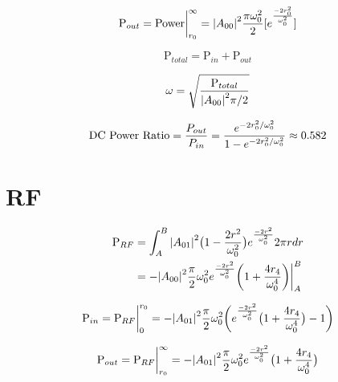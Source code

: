 \documentclass[oneside]{book}
\begin{document}
\begin{appendices}
	\begin{equation}
	\text{P}_{out} = \text{Power} \biggr\rvert_{r_0}^{\infty} = \abs{A_{00}}^2 \frac{\pi \omega_{0}^2}{2} [e^{\frac{-2r_0^2}{\omega_{0}^2}}]
	\end{equation}
	
	\begin{equation}
	\text{P}_{total} =  \text{P}_{in} + \text{P}_{out}
	\end{equation}
	
	\begin{equation}
	\omega = \sqrt{\frac{\text{P}_{total}}{\abs{A_{00}}^2 \pi / 2}}
	\end{equation}
	
	\begin{equation}
	\text{DC Power Ratio} 
	= \frac{P_{out}}{P_{in}} \\
	= \frac{e^{-2r_0^2/ \omega_{0}^2}} {1 - e^{-2r_0^2/ \omega_{0}^2 }} \approx 0.582
	\end{equation}
	
	\section{RF}
	
	\begin{equation}
	\begin{split}
	\text{P}_{RF} &= \int_{A}^{B} \abs{A_{01}}^2 \big(1-\frac{2r^2}{\omega_{0}^2}\big) e^{\frac{-2r^2}{\omega_{0}^2}} 2\pi r dr\\
	&= -\abs{A_{00}}^2 \frac{\pi}{2} \omega_{0}^2 e^{\frac{-2r^2}{\omega_{0}^2}} \bigg(1 + \frac{4 r_4}{\omega_{0}^4} \bigg)  \biggr\rvert_A^B
	\end{split}
	\end{equation}
	
	\begin{equation}
	\text{P}_{in} \\
	= \text{P}_{RF} \biggr\rvert_0^{r_0} \\
	= - \abs{A_{01}}^2  \frac{\pi}{2} \omega_{0}^2 \bigg( e^{\frac{-2r^2}{\omega_{0}^2}} \big(1 + \frac{4 r_4}{\omega_{0}^4} \big) - 1 \bigg)
	\end{equation}
	
	\begin{equation}
	\text{P}_{out} \\
	= \text{P}_{RF} \biggr\rvert_{r_0}^{\infty}\\ 
	= - \abs{A_{01}}^2  \frac{\pi}{2} \omega_{0}^2 e^{\frac{-2r^2}{\omega_{0}^2}} \big(1 + \frac{4 r_4}{\omega_{0}^4} \big) 
	\end{equation}
	

\end{appendices}
\end{document}
